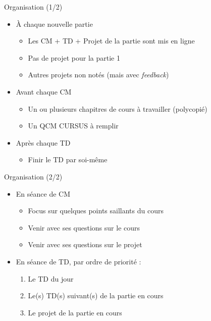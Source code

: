 \documentclass[10pt]{beamer}
\begin{document}
\begin{frame}{Organisation (1/2)}  
  \begin{itemize}
    \item À chaque nouvelle partie
    \begin{itemize}
      \item Les CM + TD + Projet de la partie sont mis en ligne
      \item Pas de projet pour la partie 1
      \item Autres projets non notés (mais avec \emph{feedback})
    \end{itemize}
    \item Avant chaque CM
    \begin{itemize}
      \item Un ou plusieurs chapitres de cours à travailler (polycopié)
      \item Un QCM CURSUS à remplir
    \end{itemize}
    \item Après chaque TD
    \begin{itemize}
      \item Finir le TD par soi-même
    \end{itemize}
  \end{itemize}
\end{frame}

\begin{frame}{Organisation (2/2)}  
  \begin{itemize}
    \item En séance de CM
    \begin{itemize}
      \item Focus sur quelques points saillants du cours
      \item Venir avec ses questions sur le cours
      \item Venir avec ses questions sur le projet
    \end{itemize}
    \item En séance de TD, par ordre de priorité :
    \begin{enumerate}
      \item Le TD du jour
      \item Le(s) TD(s) suivant(s) de la partie en cours
      \item Le projet de la partie en cours
    \end{enumerate}
  \end{itemize}
\end{frame}
\end{document}
